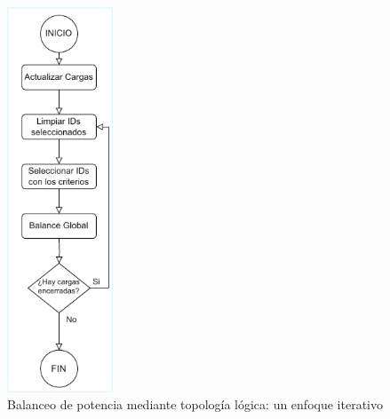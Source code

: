 \begin{figure}[ht!]
    \centering
    \includegraphics[width=0.28\textwidth]{fig/07_bloste/bloste_04.pdf}
    \caption{Balanceo de potencia mediante topología lógica: un enfoque iterativo}
    \label{fig:iterativeBalance}
\end{figure}

